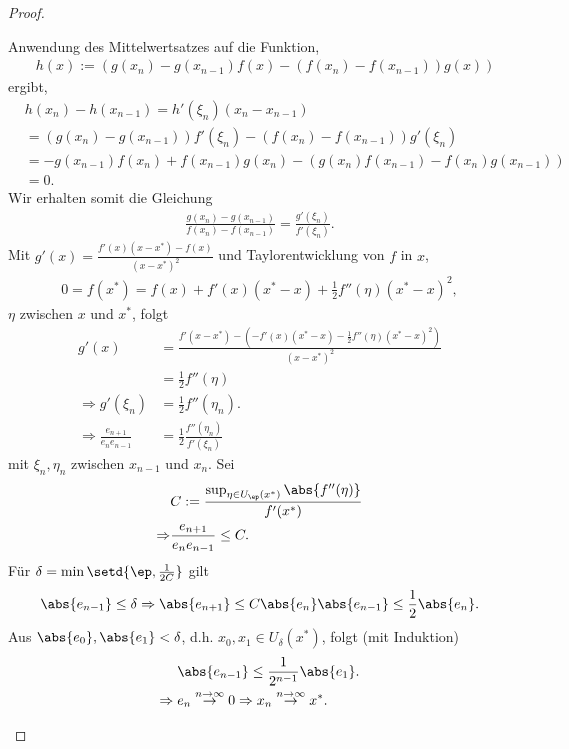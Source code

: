 \begin{proof}
\begin{enumerate}[label=\arabic{*})]
Anwendung des Mittelwertsatzes auf die Funktion,
\begin{align*}
&h(x) := \left(g(x_n)-g(x_{n-1})f(x) - (f(x_n)-f(x_{n-1}))g(x)
\right)
\end{align*}
ergibt,
\begin{align*}
 &h(x_n)-h(x_{n-1}) = h'(\xi_n) (x_n-x_{n-1})\\
 &= (g(x_n)-g(x_{n-1}))f'(\xi_n) - (f(x_n)-f(x_{n-1}))g'(\xi_n)\\
 &= -g(x_{n-1})f(x_n) + f(x_{n-1})g(x_n) -
\left(g(x_n)f(x_{n-1})-f(x_n)g(x_{n-1})\right)\\
 &=0.
\end{align*}
Wir erhalten somit die Gleichung
\begin{align*}
\frac{g(x_n)-g(x_{n-1})}{f(x_n)-f(x_{n-1})} =
\frac{g'(\xi_n)}{f'(\xi_n)}.
\end{align*}
Mit $g'(x) = \frac{f'(x)(x-x^*)-f(x)}{(x-x^*)^2}$ und Taylorentwicklung von $f$
in $x$,
\begin{align*}
0 = f(x^*) = f(x) + f'(x)(x^*-x) + \frac{1}{2}f''(\eta)(x^*-x)^2,
\end{align*}
$\eta$ zwischen $x$ und $x^*$, folgt
\begin{align*}
g'(x) &= \frac{f'(x-x^*)-\left(-f'(x)(x^* -x)-\frac{1}{2}f''(\eta)(x^*-x)^2
\right)}{(x-x^*)^2}\\
&= \frac{1}{2}f''(\eta)\\
\Rightarrow g'(\xi_n) &= \frac{1}{2}f''(\eta_n).\\
\Rightarrow
\frac{e_{n+1}}{e_ne_{n-1}}&=\frac{1}{2}\frac{f''(\eta_n)}{f'(\xi_n)}\tag{3}
\end{align*}
mit $\xi_n,\eta_n$ zwischen $x_{n-1}$ und $x_n$.
Sei
\begin{align*}
&C := \frac{\sup_{\eta\in U_\ep(x^*)}\abs{f''(\eta)}}{f'(x^*)}\\
\Rightarrow & \frac{e_{n+1}}{e_ne_{n-1}} \le C.
\end{align*}
Für $\delta = \min\setd{\ep,\frac{1}{2C}}$ gilt
\begin{align*}
\abs{e_{n-1}}\le \delta \Rightarrow \abs{e_{n+1}} \le C\abs{e_n}\abs{e_{n-1}}
\le \frac{1}{2}\abs{e_n}.
\end{align*}
Aus $\abs{e_0},\abs{e_1}<\delta$, d.h. $x_0,x_1\in U_\delta(x^*)$, folgt
(mit Induktion)
\begin{align*}
&\abs{e_{n-1}} \le \frac{1}{2^{n-1}}\abs{e_1}.\\
\Rightarrow\; &e_n\overset{n\to\infty}{\to} 0 \Rightarrow
x_n\overset{n\to\infty}{\to} x^*.
\end{align*}

\end{enumerate}
\end{proof}
